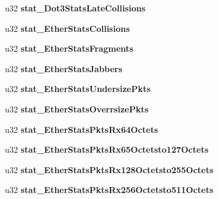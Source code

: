 \begin{DoxyCompactItemize}
\item 
\hypertarget{structstatistics__block_a90be25e557615d2b538bee0f842d6974}{
u32 {\bfseries stat\_\-Dot3StatsLateCollisions}}
\label{structstatistics__block_a90be25e557615d2b538bee0f842d6974}

\item 
\hypertarget{structstatistics__block_a551274caa7de089f6009481da936c271}{
u32 {\bfseries stat\_\-EtherStatsCollisions}}
\label{structstatistics__block_a551274caa7de089f6009481da936c271}

\item 
\hypertarget{structstatistics__block_a8d20e22c1dda2993afb95fb92970bf1f}{
u32 {\bfseries stat\_\-EtherStatsFragments}}
\label{structstatistics__block_a8d20e22c1dda2993afb95fb92970bf1f}

\item 
\hypertarget{structstatistics__block_ae2385c67aa66b4240fe551a136d68eb6}{
u32 {\bfseries stat\_\-EtherStatsJabbers}}
\label{structstatistics__block_ae2385c67aa66b4240fe551a136d68eb6}

\item 
\hypertarget{structstatistics__block_ad8ec3776f3414b5fc2540ff824492b4f}{
u32 {\bfseries stat\_\-EtherStatsUndersizePkts}}
\label{structstatistics__block_ad8ec3776f3414b5fc2540ff824492b4f}

\item 
\hypertarget{structstatistics__block_ac380fada7baca9ea7bb9fa3d29d674f4}{
u32 {\bfseries stat\_\-EtherStatsOverrsizePkts}}
\label{structstatistics__block_ac380fada7baca9ea7bb9fa3d29d674f4}

\item 
\hypertarget{structstatistics__block_adebbef25919b8322652ea3158116dff4}{
u32 {\bfseries stat\_\-EtherStatsPktsRx64Octets}}
\label{structstatistics__block_adebbef25919b8322652ea3158116dff4}

\item 
\hypertarget{structstatistics__block_ab33c5d2dbd562d41e232482362f4d467}{
u32 {\bfseries stat\_\-EtherStatsPktsRx65Octetsto127Octets}}
\label{structstatistics__block_ab33c5d2dbd562d41e232482362f4d467}

\item 
\hypertarget{structstatistics__block_ab795e76249c397c6abbede19381d8f8d}{
u32 {\bfseries stat\_\-EtherStatsPktsRx128Octetsto255Octets}}
\label{structstatistics__block_ab795e76249c397c6abbede19381d8f8d}

\item 
\hypertarget{structstatistics__block_a1c07fa3348223be5f376470ba56d1840}{
u32 {\bfseries stat\_\-EtherStatsPktsRx256Octetsto511Octets}}
\label{structstatistics__block_a1c07fa3348223be5f376470ba56d1840}


\end{DoxyCompactItemize}
